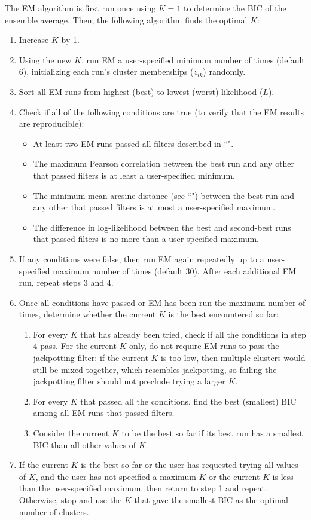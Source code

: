 \documentclass{article}
\begin{document}
The EM algorithm is first run once using $K = 1$ to determine the BIC of the ensemble average.
Then, the following algorithm finds the optimal $K$:
\begin{enumerate}
    \item Increase $K$ by 1.
    \item Using the new $K$, run EM a user-specified minimum number of times (default 6), initializing each run's cluster memberships ($z_{ik}$) randomly.
    \item Sort all EM runs from highest (best) to lowest (worst) likelihood ($L$).
    \item Check if all of the following conditions are true (to verify that the EM results are reproducible):
    \begin{itemize}
        \item At least two EM runs passed all filters described in ``".
        \item The maximum Pearson correlation between the best run and any other that passed filters is at least a user-specified minimum.
        \item The minimum mean arcsine distance (see ``") between the best run and any other that passed filters is at most a user-specified maximum.
        \item The difference in log-likelihood between the best and second-best runs that passed filters is no more than a user-specified maximum.
    \end{itemize}
    \item If any conditions were false, then run EM again repeatedly up to a user-specified maximum number of times (default 30). After each additional EM run, repeat steps 3 and 4.
    \item Once all conditions have passed or EM has been run the maximum number of times, determine whether the current $K$ is the best encountered so far:
    \begin{enumerate}
        \item For every $K$ that has already been tried, check if all the conditions in step 4 pass. For the current $K$ only, do not require EM runs to pass the jackpotting filter: if the current $K$ is too low, then multiple clusters would still be mixed together, which resembles jackpotting, so failing the jackpotting filter should not preclude trying a larger $K$.
        \item For every $K$ that passed all the conditions, find the best (smallest) BIC among all EM runs that passed filters.
        \item Consider the current $K$ to be the best so far if its best run has a smallest BIC than all other values of $K$.
    \end{enumerate}
    \item If the current $K$ is the best so far or the user has requested trying all values of $K$, and the user has not specified a maximum $K$ or the current $K$ is less than the user-specified maximum, then return to step 1 and repeat. Otherwise, stop and use the $K$ that gave the smallest BIC as the optimal number of clusters.
\end{enumerate}
\end{document}
